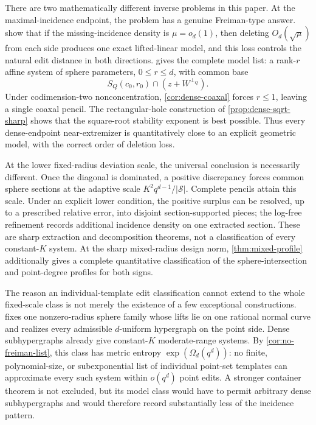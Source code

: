 \documentclass[11pt,letterpaper]{amsart}
\theoremstyle{definition}
\theoremstyle{remark}
\newcommand{\1}{\mathbf 1}
\begin{document}
There are two mathematically different inverse problems in this paper.  At the maximal-incidence endpoint, the problem has a genuine Freiman-type answer.   show that if the missing-incidence density is $\mu=o_d(1)$, then deleting $O_d(\sqrt\mu)$ from each side produces one exact lifted-linear model, and this loss controls the natural edit distance in both directions.   gives the complete model list: a rank-$r$ affine system of sphere parameters, $0\le r\le d$, with common base
\[
 S_Q(c_0,r_0)\cap(z+W^{\perp_Q}).
\]
Under codimension-two nonconcentration, \cref{cor:dense-coaxal} forces $r\le1$, leaving a single coaxal pencil.  The rectangular-hole construction of \cref{prop:dense-sqrt-sharp} shows that the square-root stability exponent is best possible.  Thus every dense-endpoint near-extremizer is quantitatively close to an explicit geometric model, with the correct order of deletion loss.

At the lower fixed-radius deviation scale, the universal conclusion is necessarily different.  Once the diagonal is dominated, a positive discrepancy forces common sphere sections at the adaptive scale $K^2q^{d-1}/|\mathcal S|$.  Complete pencils attain this scale.  Under an explicit lower condition, the positive surplus can be resolved, up to a prescribed relative error, into disjoint section-supported pieces; the log-free refinement records additional incidence density on one extracted section.  These are sharp extraction and decomposition theorems, not a classification of every constant-$K$ system.  At the sharp mixed-radius design norm, \cref{thm:mixed-profile} additionally gives a complete quantitative classification of the sphere-intersection and point-degree profiles for both signs.

The reason an individual-template edit classification cannot extend to the whole fixed-scale class is not merely the existence of a few exceptional constructions.   fixes one nonzero-radius sphere family whose lifts lie on one rational normal curve and realizes every admissible $d$-uniform hypergraph on the point side.  Dense subhypergraphs already give constant-$K$ moderate-range systems.  By \cref{cor:no-freiman-list}, this class has metric entropy $\exp(\Omega_d(q^d))$: no finite, polynomial-size, or subexponential list of individual point-set templates can approximate every such system within $o(q^d)$ point edits.  A stronger container theorem is not excluded, but its model class would have to permit arbitrary dense subhypergraphs and would therefore record substantially less of the incidence pattern.
\end{document}
